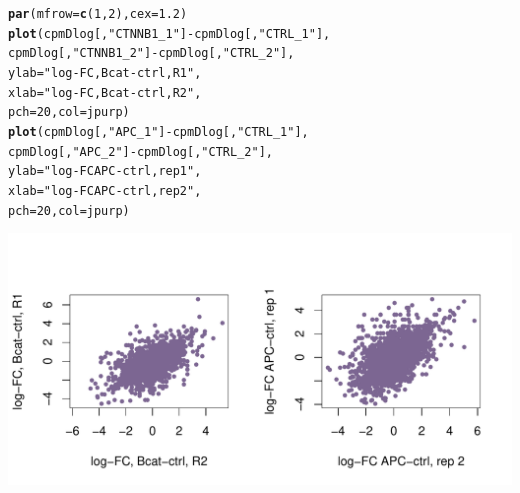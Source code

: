 \documentclass[a4paper]{article}
\makeatletter
\def\maxwidth{ %
  \ifdim\Gin@nat@width>\linewidth
    \linewidth
  \else
    \Gin@nat@width
  \fi
}
\newcommand{\hlnum}[1]{\textcolor[rgb]{0.686,0.059,0.569}{#1}}%
\newcommand{\hlstr}[1]{\textcolor[rgb]{0.192,0.494,0.8}{#1}}%
\newcommand{\hlopt}[1]{\textcolor[rgb]{0,0,0}{#1}}%
\newcommand{\hlstd}[1]{\textcolor[rgb]{0.345,0.345,0.345}{#1}}%
\newcommand{\hlkwc}[1]{\textcolor[rgb]{0.333,0.667,0.333}{#1}}%
\newcommand{\hlkwd}[1]{\textcolor[rgb]{0.737,0.353,0.396}{\textbf{#1}}}%
\newenvironment{kframe}{%
 \def\at@end@of@kframe{}%
 \ifinner\ifhmode%
  \def\at@end@of@kframe{\end{minipage}}%
  \begin{minipage}{\columnwidth}%
 \fi\fi%
 \def\FrameCommand##1{\hskip\@totalleftmargin \hskip-\fboxsep
 \colorbox{shadecolor}{##1}\hskip-\fboxsep
     \hskip-\linewidth \hskip-\@totalleftmargin \hskip\columnwidth}%
 \MakeFramed {\advance\hsize-\width
   \@totalleftmargin\z@ \linewidth\hsize
   \@setminipage}}%
 {\par\unskip\endMakeFramed%
 \at@end@of@kframe}
\newenvironment{knitrout}{}{} %
\makeatother
\begin{document}
\begin{knitrout}
\color{fgcolor}\begin{kframe}
\begin{alltt}
\hlkwd{par}\hlstd{(}\hlkwc{mfrow}\hlstd{=}\hlkwd{c}\hlstd{(}\hlnum{1}\hlstd{,}\hlnum{2}\hlstd{),} \hlkwc{cex}\hlstd{=}\hlnum{1.2}\hlstd{)}
\hlkwd{plot}\hlstd{(cpmDlog[,}\hlstr{"CTNNB1_1"}\hlstd{]}\hlopt{-}\hlstd{cpmDlog[,}\hlstr{"CTRL_1"}\hlstd{],}
     \hlstd{cpmDlog[,}\hlstr{"CTNNB1_2"}\hlstd{]}\hlopt{-}\hlstd{cpmDlog[,}\hlstr{"CTRL_2"}\hlstd{],}
     \hlkwc{ylab}\hlstd{=}\hlstr{"log-FC, Bcat-ctrl, R1"}\hlstd{,}
     \hlkwc{xlab}\hlstd{=}\hlstr{"log-FC, Bcat-ctrl, R2"}\hlstd{,}
     \hlkwc{pch}\hlstd{=}\hlnum{20}\hlstd{,} \hlkwc{col}\hlstd{=jpurp)}
\hlkwd{plot}\hlstd{(cpmDlog[,}\hlstr{"APC_1"}\hlstd{]}\hlopt{-}\hlstd{cpmDlog[,}\hlstr{"CTRL_1"}\hlstd{],}
     \hlstd{cpmDlog[,}\hlstr{"APC_2"}\hlstd{]}\hlopt{-}\hlstd{cpmDlog[,}\hlstr{"CTRL_2"}\hlstd{],}
     \hlkwc{ylab}\hlstd{=}\hlstr{"log-FC APC-ctrl, rep 1"}\hlstd{,}
     \hlkwc{xlab}\hlstd{=}\hlstr{"log-FC APC-ctrl, rep 2"}\hlstd{,}
     \hlkwc{pch}\hlstd{=}\hlnum{20}\hlstd{,} \hlkwc{col}\hlstd{=jpurp)}
\end{alltt}
\end{kframe}
\includegraphics[width=\maxwidth]{figure/voomRepPlot} 

\end{knitrout}
\end{document}

